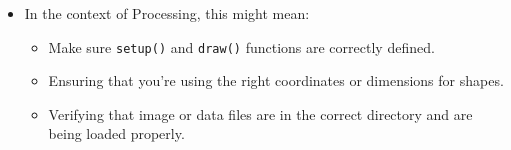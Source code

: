 \documentclass[
]{article}
\begin{document}
\begin{enumerate}
  \begin{itemize}
  \item
    In the context of Processing, this might mean:

    \begin{itemize}
    \item
      Make sure \texttt{setup()} and \texttt{draw()} functions are
      correctly defined.
    \item
      Ensuring that you're using the right coordinates or dimensions for
      shapes.
    \item
      Verifying that image or data files are in the correct directory
      and are being loaded properly.
    \end{itemize}
  \end{itemize}
\end{enumerate}
\end{document}
